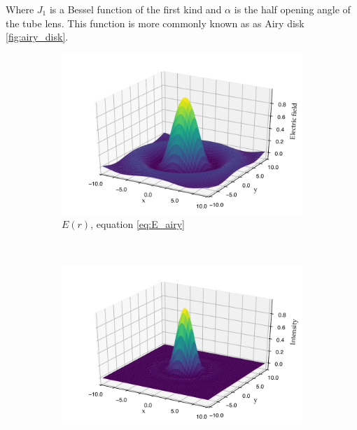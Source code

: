 Where $J_1$ is a Bessel function of the first kind and $\alpha$ is the half opening angle of the tube lens.
This function is more commonly known as as Airy disk \ref{fig:airy_disk}.


\begin{figure}
    \centering
    \begin{subfigure}[b]{\textwidth}
        \includegraphics{+airy_E_fill}
        \caption{$E(r)$, equation \eqref{eq:E_airy}}
        \label{fig:airy_E_fill}
    \end{subfigure}
    ~
    \begin{subfigure}[b]{\textwidth}
        \includegraphics{+airy_I_fill}

\end{subfigure}
\end{figure}
